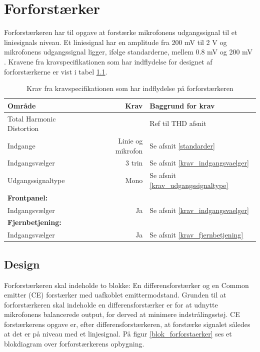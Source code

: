 \chapter{Forforstærker}

Forforstærkeren har til opgave at forstærke mikrofonens udgangssignal til et liniesignals niveau. Et liniesignal har en amplitude fra 200 mV til 2 V og mikrofonens udgangssignal ligger, ifølge standarderne, mellem 0.8 mV og 200 mV . 
Kravene fra kravspecifikationen som har indflydelse for designet af forforstærkerne er vist i tabel \ref{tab:krav_forforstaerker}.

\begin{table}[h]
\centering
\begin{tabular}{l|r|l}
\hline\hline
Område & Krav & Baggrund for krav \\
\hline\hline
Total Harmonic Distortion & \color{red}{<1 \%} & Ref til THD afsnit \\
Indgange & Linie og mikrofon & Se afsnit \ref{standarder} \\
Indgangsvælger & 3 trin & Se afsnit \ref{krav_indgangsvaelger} \\
Udgangssignaltype & Mono & Se afsnit \ref{krav_udgangssignaltype} \\
\textbf{Frontpanel:} & & \\
Indgangsvælger & Ja & Se afsnit \ref{krav_indgangsvaelger} \\
\textbf{Fjernbetjening:} & & \\
Indgangsvælger & Ja &  Se afsnit \ref{krav_fjernbetjening}\\
\hline\hline
\end{tabular}
\caption{Krav fra kravspecifikationen som har indflydelse på forforstærkeren}
\label{tab:krav_forforstaerker}
\end{table}



\section{Design}
Forforstærkeren skal indeholde to blokke: En differensforstærker og en Common emitter (CE) forstærker med uafkoblet emittermodstand. Grunden til at forforstærkeren skal indeholde en differensforstærker er for at udnytte mikrofonens balancerede output, for derved at minimere indstrålingsstøj. CE forstærkerens opgave er, efter differensforstærkeren, at forstærke signalet således at det er på niveau med et linjesignal. På figur \ref{blok_forforstaerker} ses et blokdiagram over forforstærkerens opbygning. 

